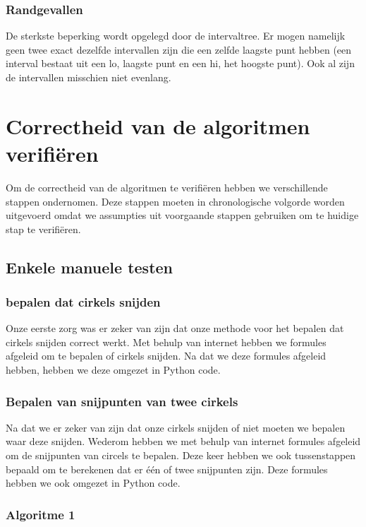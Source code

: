 \documentclass[11pt,a4paper]{article}
\begin{document}
\subsubsection{Randgevallen}
De sterkste beperking wordt opgelegd door de intervaltree. Er mogen namelijk geen twee exact dezelfde intervallen zijn die een zelfde laagste punt hebben (een interval bestaat uit een lo, laagste punt en een hi, het hoogste punt). Ook al zijn de intervallen misschien niet evenlang. 
\section{Correctheid van de algoritmen verifi\"eren}

Om de correctheid van de algoritmen te verifi\"eren hebben we verschillende stappen ondernomen. Deze stappen moeten in chronologische volgorde worden uitgevoerd omdat we assumpties uit voorgaande stappen gebruiken om te huidige stap te verifi\"eren.

\subsection{Enkele manuele testen}

\subsubsection*{bepalen dat cirkels snijden}
Onze eerste zorg was er zeker van zijn dat onze methode voor het bepalen dat cirkels snijden correct werkt. Met behulp van internet hebben we formules afgeleid om te bepalen of cirkels snijden. Na dat we deze formules afgeleid hebben, hebben we deze omgezet in Python code.

\subsubsection*{Bepalen van snijpunten van twee cirkels}
Na dat we er zeker van zijn dat onze cirkels snijden of niet moeten we bepalen waar deze snijden. Wederom hebben we met behulp van internet formules afgeleid om de snijpunten van circels te bepalen. Deze keer hebben we ook tussenstappen bepaald om te berekenen dat er \'e\'en of twee snijpunten zijn. Deze formules hebben we ook omgezet in Python code.

\subsubsection*{Algoritme 1}
\end{document}
